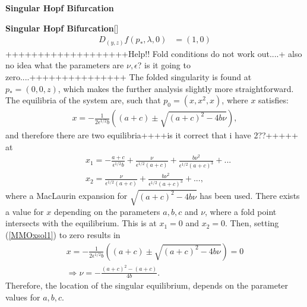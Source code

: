 \begin{theorem}
\begin{theorem}
\begin{theorem}
\begin{definition}{\textbf{Singular Hopf Bifurcation} \citealp{strogatz2007nonlinear}}
\begin{definition}{\textbf{Singular Hopf Bifurcation}}[\citealp{strogatz2007nonlinear}]
\begin{align*}
D_{(y,z)}f(p_*,\lambda,0) &= (1,0)
\end{align*}
+++++++++++++++++++Help!! Fold conditions do not work out....+ also no idea what the parameters are $\nu, \epsilon$? is it going to zero....+++++++++++++++
The folded singularity is found at $p_*= (0,0,z)$, which makes the further analysis slightly more straightforward.
The equilibria of the system are, such that $p_0= (x,x^2,x)$, where $x$ satisfies:
\begin{align}\label{MMOxsol1}
x = -\frac{1}{2 \epsilon^{1/2} b} \left( (a+c) \pm \sqrt{ (a+c)^2 - 4 b \nu } \right),
\end{align}
and therefore there are two equilibria++++is it correct that i have 2??+++++ at
\begin{align*}
&x_1=-\frac{a+c}{ \epsilon^{1/2} b} + \frac{\nu}{\epsilon^{1/2} (a+c)} + \frac{b \nu^2}{\epsilon^{1/2} (a+c)^3} + ... \\
&x_2= \frac{\nu}{\epsilon^{1/2} (a+c)} + \frac{b \nu^2}{\epsilon^{1/2} (a+c)^3} + ...,
\end{align*}
where a MacLaurin expansion for $\sqrt{ (a+c)^2 - 4 b \nu }$ has been used.
There exists a value for $x$ depending on the parameters $a,b,c$ and $\nu$, where a fold point intersects with the equilibrium. This is at $x_1=0$ and $x_2=0$.
Then, setting (\ref{MMOxsol1}) to zero results in
\begin{align*}
x=-\frac{1}{2 \epsilon^{1/2} b} \left( (a+c) \pm \sqrt{ (a+c)^2 - 4 b \nu } \right)=0\\
\Rightarrow \nu = - \frac{ (a+c)^2 - (a+c)}{4b}.
\end{align*}
Therefore, the location of the singular equilibrium, depends on the parameter values for $a,b,c$.


\end{definition}
\end{definition}
\end{theorem}
\end{theorem}
\end{theorem}

